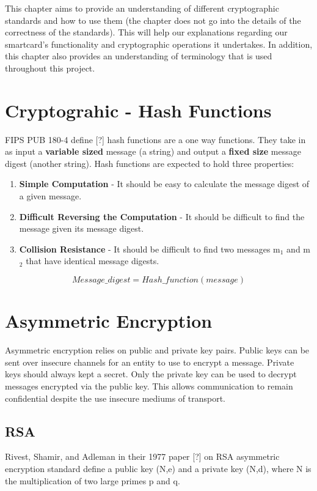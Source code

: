\documentclass[bsc,frontabs,twoside,singlespacing,parskip,deptreport]{infthesis}     %
\begin{document}
This chapter aims to provide an understanding of different cryptographic standards and how to use them (the chapter does not go into the details of the correctness of the standards). This will help our explanations regarding our smartcard's functionality and cryptographic operations it undertakes. In addition, this chapter also provides an understanding of terminology that is used throughout this project.

\section{Cryptograhic - Hash Functions}

FIPS PUB 180-4 define [?] hash functions are a one way functions. They take in as input a \textbf{variable sized} message (a string) and output a \textbf{fixed size} message digest (another string). Hash functions are expected to hold three properties:
\begin{enumerate}
\item \textbf{Simple Computation} - It should be easy to calculate the message digest of a given message.
\item \textbf{Difficult Reversing the Computation} - It should be difficult to find the message given its message digest.
\item \textbf{Collision Resistance} - It should be difficult to find two messages m$_1$ and m$_2$ that have identical message digests.
\end{enumerate}


$$ Message\_digest = Hash\_function(message) $$


\section{Asymmetric Encryption}

Asymmetric encryption relies on public and private key pairs. Public keys can be sent over insecure channels for an entity to use to encrypt a message. Private keys should always kept a secret. Only the private key can be used to decrypt messages encrypted via the public key. This allows communication to remain confidential despite the use insecure mediums of transport.

\subsection{RSA}
Rivest, Shamir, and Adleman in their 1977 paper [?] on RSA asymmetric encryption standard define a public key (N,e) and a private key (N,d), where N is the multiplication of two large primes p and q. 
\end{document}
